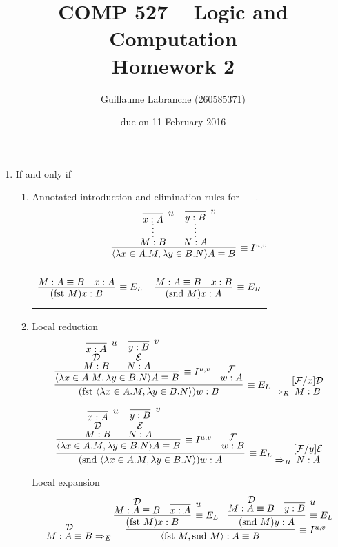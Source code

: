 \documentclass{article}
\author{Guillaume Labranche (260585371)}
\title{COMP 527 -- Logic and Computation\\Homework 2}
\date{due on 11 February 2016}
\renewcommand{\t}{\text{}}
\newcommand{\fst}{\text{fst }}
\newcommand{\snd}{\text{snd }}
\begin{document}
\maketitle

\begin{enumerate}[label=\textbf{Exercise \arabic*}]


\item If and only if

\begin{enumerate}[label=\textbf{Task \arabic*},leftmargin=1em]
\item Annotated introduction and elimination rules for $\equiv$.
\[
\infer[\equiv I^{u,v}]
  {\langle \lambda x \in A.M,\lambda y \in B.N \rangle A \equiv B \t}
  {\infer*{M:B\t}{\infer[u]{x:A\t}{}} & \infer*{N:A\t}{\infer[v]{y:B\t}{}}}
\]
\begin{tabular}{cc}
$$
\infer[\equiv E_L]
  {(\fst M) x : B \t}
  {M:A \equiv B \t & x : A \t}
$$
&
$$
\infer[\equiv E_R]
  {(\snd M) x : A \t}
  {M:A \equiv B \t & x : B \t}
$$
\end{tabular}

\item Local reduction %
\[
\infer[\equiv E_L]
  { (\fst \langle \lambda x \in A.M,\lambda y \in B.N \rangle) w : B \t}
  {\infer[\equiv I^{u,v}]
    {\langle \lambda x \in A.M,\lambda y \in B.N \rangle A \equiv B \t}
    {\deduce[\mathcal{D}]{M:B\t}{\infer[u]{x:A\t}{}}
     & \deduce[\mathcal{E}]{N:A\t}{\infer[v]{y:B\t}{}}
     }
  & \deduce[\mathcal{F}]{w:A \t}{}
  }
\Rightarrow_R
\deduce[{[}\mathcal{F}/x{]}\mathcal{D}]
  {M:B \t}
  {}
\]

\[
\infer[\equiv E_L]
  { (\snd \langle \lambda x \in A.M,\lambda y \in B.N \rangle) w : A \t}
  {\infer[\equiv I^{u,v}]
    {\langle \lambda x \in A.M,\lambda y \in B.N \rangle A \equiv B \t}
    {\deduce[\mathcal{D}]{M:B\t}{\infer[u]{x:A\t}{}}
     & \deduce[\mathcal{E}]{N:A\t}{\infer[v]{y:B\t}{}}
     }
  & \deduce[\mathcal{F}]{w:B \t}{}
  }
\Rightarrow_R
\deduce[{[}\mathcal{F}/y{]}\mathcal{E}]
  {N:A \t}
  {}
\]

Local expansion %
\[
\deduce[\mathcal{D}]{M : A \equiv B \t}{}
\Rightarrow_E
\infer[\equiv I^{u,v}]
  {\langle \fst M, \snd M \rangle : A \equiv B \t}
  {\infer[\equiv E_L]
    {(\fst M)x : B \t}
    {\deduce[\mathcal{D}]{M : A \equiv B \t}{}
    & \infer[u]{x:A \t}{}}
  &\infer[\equiv E_L]
    {(\snd M)y : A \t}
    {\deduce[\mathcal{D}]{M : A \equiv B \t}{}
    & \infer[u]{y:B \t}{}}
  }
\]


\end{enumerate}
\end{enumerate}
\end{document}
